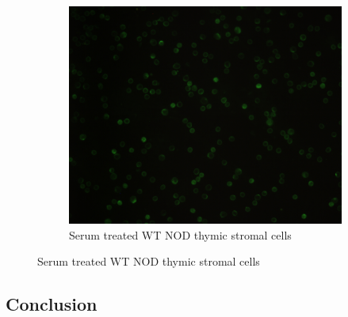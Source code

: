 
\begin{figure}
	\begin{subfigure}{\textwidth}
		\includegraphics[width=\textwidth]{Figures/WTserum2.jpg}
		\caption{Serum treated WT NOD thymic stromal cells}
	\end{subfigure}
\end{figure}

\subsection{Conclusion}


